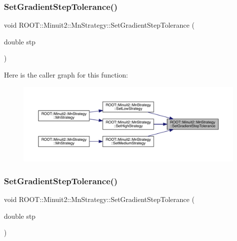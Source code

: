 \subsubsection{\texorpdfstring{SetGradientStepTolerance()}{SetGradientStepTolerance()}\hspace{0.1cm}{\footnotesize\ttfamily [1/2]}}
{\footnotesize\ttfamily void R\+O\+O\+T\+::\+Minuit2\+::\+Mn\+Strategy\+::\+Set\+Gradient\+Step\+Tolerance (\begin{DoxyParamCaption}\item[{double}]{stp }\end{DoxyParamCaption})\hspace{0.3cm}{\ttfamily [inline]}}

Here is the caller graph for this function\+:\nopagebreak
\begin{figure}[H]
\begin{center}
\leavevmode
\includegraphics[width=350pt]{da/de4/classROOT_1_1Minuit2_1_1MnStrategy_ad6051100db67df070103c2478740ee8f_icgraph}
\end{center}
\end{figure}
\mbox{\label{classROOT_1_1Minuit2_1_1MnStrategy_ad6051100db67df070103c2478740ee8f}} 
\subsubsection{\texorpdfstring{SetGradientStepTolerance()}{SetGradientStepTolerance()}\hspace{0.1cm}{\footnotesize\ttfamily [2/2]}}
{\footnotesize\ttfamily void R\+O\+O\+T\+::\+Minuit2\+::\+Mn\+Strategy\+::\+Set\+Gradient\+Step\+Tolerance (\begin{DoxyParamCaption}\item[{double}]{stp }\end{DoxyParamCaption})\hspace{0.3cm}{\ttfamily [inline]}}

